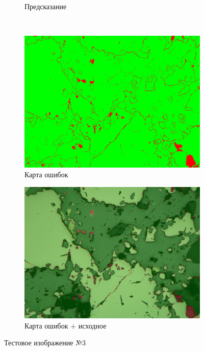 \begin{figure}[H]
\begin{subfigure}{.33\textwidth}
  \caption{Предсказание}
  \label{fig:sfig3_3}
\end{subfigure} \\
\centering
\begin{subfigure}{.33\textwidth}
  \centering
  \includegraphics[width=.9\linewidth]{pics/image_5_error.jpg}
  \caption{Карта ошибок}
  \label{fig:sfig3_4}
\end{subfigure}%
\begin{subfigure}{.33\textwidth}
  \centering
  \includegraphics[width=.9\linewidth]{pics/image_5_overlay.jpg}
  \caption{Карта ошибок + исходное}
  \label{fig:sfig3_5}
\end{subfigure}
\caption{Тестовое изображение №3}
\label{fig:pred3}
\end{figure}

